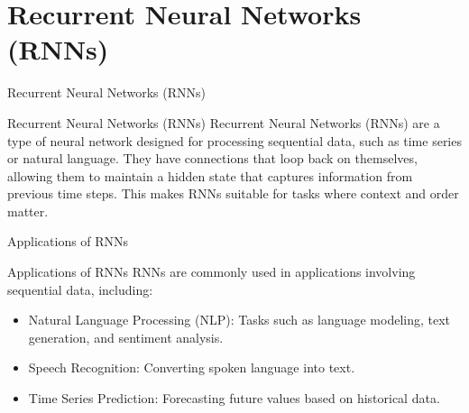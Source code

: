 \documentclass[hyperref={pdfpagelabels=false},aspectratio=169]{beamer}
\begin{document}
\section[RNNs]{Recurrent Neural Networks (RNNs)}
\label{sec:orgd234b19}
\begin{frame}[label={sec:orgb122f60}]{Recurrent Neural Networks (RNNs)}
\begin{block}{Recurrent Neural Networks (RNNs)}
Recurrent Neural Networks (RNNs) are a type of neural network designed for processing sequential data, such as time series or natural language. They have connections that loop back on themselves, allowing them to maintain a hidden state that captures information from previous time steps. This makes RNNs suitable for tasks where context and order matter.
\end{block}
\end{frame}
\begin{frame}[label={sec:org10fb6ad}]{Applications of RNNs}
\begin{block}{Applications of RNNs}
RNNs are commonly used in applications involving sequential data, including:
\begin{itemize}
\item \alert{Natural Language Processing (NLP)}: Tasks such as language modeling, text generation, and sentiment analysis.
\item \alert{Speech Recognition}: Converting spoken language into text.
\item \alert{Time Series Prediction}: Forecasting future values based on historical data.
\end{itemize}
\end{block}
\end{frame}
\end{document}
